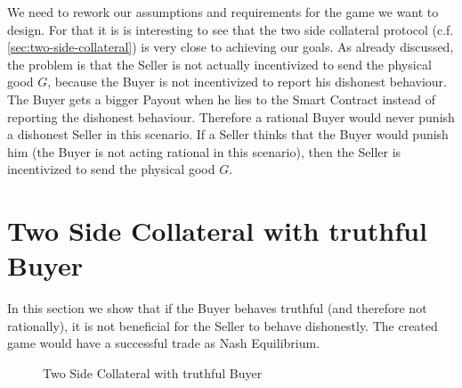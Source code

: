 \documentclass{cacthesis}
\begin{document}
We need to rework our assumptions and requirements for the game we want to design. For that it is is interesting to see that the two side collateral protocol (c.f. \ref{sec:two-side-collateral}) is very close to achieving our goals. As already discussed, the problem is that the Seller is not actually incentivized to send the physical good $G$, because the Buyer is not incentivized to report his dishonest behaviour. The Buyer gets a bigger Payout when he lies to the Smart Contract instead of reporting the dishonest behaviour. Therefore a rational Buyer would never punish a dishonest Seller in this scenario. If a Seller thinks that the Buyer would punish him (the Buyer is not acting rational in this scenario), then the Seller is incentivized to send the physical good $G$.\newline
\section{Two Side Collateral with truthful Buyer} 
In this section we show that if the Buyer behaves truthful (and therefore not rationally), it is not beneficial for the Seller to behave dishonestly. The created game would have a successful trade as Nash Equilibrium.\newline
\begin{figure}[htb!]
    \centering

    \caption{Two Side Collateral with truthful Buyer}
\end{figure}
\end{document}

